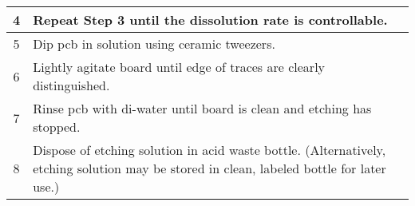 \documentclass[../main.tex]{subfiles}%
\begin{document}
\begin{table}[p]
\begin{tabu}{ c p{5.00in} }
            \midrule%
            4 & Repeat \textbf{Step 3} until the dissolution rate is controllable.\\%
            \midrule%
            5 & Dip \gls{pcb} in solution using ceramic tweezers.\\%
            \midrule%
            6 & Lightly agitate board until edge of traces are clearly distinguished.\\%
            \midrule%
            7 & Rinse \gls{pcb} with \gls{di-water} until board is clean and etching has stopped.\\%
            \midrule%
            8 & Dispose of etching solution in acid waste bottle. (Alternatively, etching solution may be stored in clean, labeled bottle for later use.)\\%
            \bottomrule%
        \end{tabu}%
    \end{table}%
\end{document}
